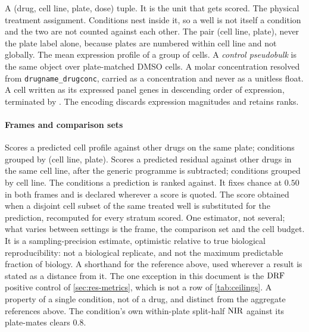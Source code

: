 \begin{description}[leftmargin=1em, itemsep=0.5ex,
                    font=\normalfont\bfseries]
 A (drug, cell line, plate, dose) tuple. It is the
  unit that gets scored.
 The physical treatment assignment. Conditions
  nest inside it, so a well is not itself a condition and the two are not
  counted against each other.
 The pair (cell line, plate), never the plate
  label alone, because plates are numbered within cell line and not globally.
 The mean expression profile of a group of
  cells. A \emph{control pseudobulk} is the same object over plate-matched DMSO
  cells.
 A molar concentration resolved from
  \texttt{drugname\_drugconc}, carried as a concentration and never as a
  unitless float.
 A cell written as its expressed panel
  genes in descending order of expression, terminated by \ENDCELL. The encoding
  discards expression magnitudes and retains ranks.
\end{description}

\paragraph{Frames and comparison sets}

\begin{description}[leftmargin=1em, itemsep=0.5ex,
                    font=\normalfont\bfseries]
 Scores a predicted cell profile against
  other drugs on the same plate; conditions grouped by (cell line, plate).
 Scores a predicted residual against other
  drugs in the same cell line, after the generic programme is subtracted;
  conditions grouped by cell line.
 The conditions a prediction is ranked
  against. It fixes chance at $0.50$ in both frames and is declared wherever a
  score is quoted.
 The score
  obtained when a disjoint cell subset of the same treated well is substituted
  for the prediction, recomputed for every stratum scored. One estimator, not
  several; what varies between settings is the frame, the comparison set and the
  cell budget. It is a sampling-precision estimate, optimistic relative to true
  biological reproducibility: not a biological replicate, and not the maximum
  predictable fraction of biology.
 A shorthand for the reference above, used wherever a
  result is stated as a distance from it. The one exception in this document is
  the $\textrm{DRF}$ positive control of \cref{sec:res-metrics}, which is not a row of
  \cref{tab:ceilings}.
 A property of a single condition, not
  of a drug, and distinct from the aggregate references above. The
  condition's own within-plate split-half $\textrm{NIR}$ against its plate-mates clears
  $0.8$.
\end{description}

